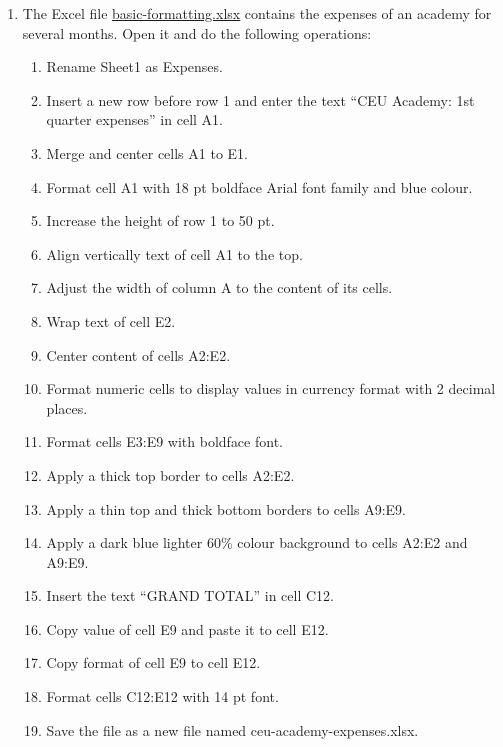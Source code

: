 \begin{enumerate}[leftmargin=*]
\item The Excel file
\href{http://aprendeconalf.es/office/excel/exercises/introduction/basic-formatting.xlsx}{\textsf{basic-formatting.xlsx}}
contains the expenses of an academy for several months.
Open it and do the following operations:
\begin{enumerate}
\item Rename \textsf{Sheet1} as \textsf{Expenses}.
\item Insert a new row before row 1 and enter the text ``CEU Academy: 1st quarter expenses'' in cell A1.
\item Merge and center cells A1 to E1.
\item Format cell A1 with 18 pt boldface Arial font family and blue colour.
\item Increase the height of row 1 to 50 pt.
\item Align vertically text of cell A1 to the top.
\item Adjust the width of column A to the content of its cells.
\item Wrap text of cell E2.
\item Center content of cells A2:E2.
\item Format numeric cells to display values in currency format with 2 decimal places.
\item Format cells E3:E9 with boldface font.
\item Apply a thick top border to cells A2:E2.
\item Apply a thin top and thick bottom borders to cells A9:E9.
\item Apply a dark blue lighter 60\% colour background to cells A2:E2 and A9:E9.
\item Insert the text ``GRAND TOTAL'' in cell C12.
\item Copy value of cell E9 and paste it to cell E12.
\item Copy format of cell E9 to cell E12. 
\item Format cells C12:E12 with 14 pt font.
\item Save the file as a new file named \textsf{ceu-academy-expenses.xlsx}.
\end{enumerate}

\end{enumerate}